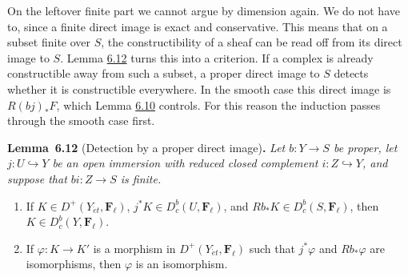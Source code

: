 \documentclass[11pt]{article}
\newenvironment{bpstatement}[2]{\par\addvspace{0.6\baselineskip}\noindent\textbf{#1}#2\textbf{.}\enspace\ignorespaces}
  {\par\addvspace{0.4\baselineskip}}
\newenvironment{bpstatementit}[2]{\begin{bpstatement}{#1}{#2}\itshape\ignorespaces}{\end{bpstatement}}
\providecommand{\Dbc}{}\renewcommand{\Dbc}{D^b_c}
\providecommand{\Fell}{}\renewcommand{\Fell}{\mathbf F_\ell}
\begin{document}
On the leftover finite part we cannot argue by dimension again. We do not have to, since a finite direct image is exact and conservative. This means that on a subset finite over \(S\), the constructibility of a sheaf can be read off from its direct image to \(S\). Lemma \hyperref[bp38]{6.12} turns this into a criterion. If a complex is already constructible away from such a subset, a proper direct image to \(S\) detects whether it is constructible everywhere. In the smooth case this direct image is \(R(bj)_*F\), which Lemma \hyperref[bp33]{6.10} controls. For this reason the induction passes through the smooth case first.

\label{bp38}%
\begin{bpstatementit}{Lemma~6.12}{ (Detection by a proper direct image)}
Let \(b:Y\to S\) be proper, let \(j:U\hookrightarrow Y\) be an open immersion with reduced closed complement \(i:Z\hookrightarrow Y\), and suppose that \(bi:Z\to S\) is finite.

\begin{enumerate}
\item If \(K\in D^+(Y_{\acute{e}t},\Fell)\), \(j^*K\in\Dbc(U,\Fell)\), and \(Rb_*K\in\Dbc(S,\Fell)\), then \(K\in\Dbc(Y,\Fell)\).
\item If \(\varphi:K\to K'\) is a morphism in \(D^+(Y_{\acute{e}t},\Fell)\) such that \(j^*\varphi\) and \(Rb_*\varphi\) are isomorphisms, then \(\varphi\) is an isomorphism.
\end{enumerate}
\end{bpstatementit}
\end{document}

